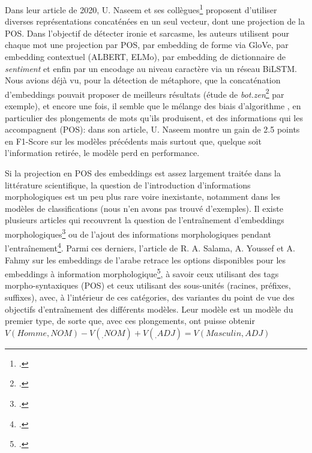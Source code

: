 Dans leur article de 2020, U. Naseem et ses collègues\footcite{naseem_towards_2020} proposent d'utiliser diverses représentations concaténées en un seul vecteur, dont une projection de la POS. Dans l'objectif de détecter ironie et sarcasme, les auteurs utilisent pour chaque mot une projection par POS, par embedding de forme via GloVe, par embedding contextuel (ALBERT, ELMo), par embedding de dictionnaire de \textit{sentiment} et enfin par un encodage au niveau caractère via un réseau BiLSTM. Nous avions déjà vu, pour la détection de métaphore, que la concaténation d'embeddings pouvait proposer de meilleurs résultats (étude de \textit{bot.zen}\footcite{stemle_using_2018} par exemple), et encore une fois, il semble que le mélange des biais d'algorithme  , en particulier des plongements de mots qu'ils produisent, et des informations qui les accompagnent (POS): dans son article, U. Naseem montre un gain de 2.5 points en F1-Score sur les modèles précédents mais surtout que, quelque soit l'information retirée, le modèle perd en performance.

Si la projection en POS des embeddings est assez largement traitée dans la littérature scientifique, la question de l'introduction d'informations morphologiques est un peu plus rare voire inexistante, notamment dans les modèles de classifications (nous n'en avons pas trouvé d'exemples). Il existe plusieurs articles qui recouvrent la question de l'entraînement d'embeddings morphologiques\footcite{cotterell_morphological_2015} ou de l'ajout des informations morphologiques pendant l'entraînement\footcite{cui_knet_2015}. Parmi ces derniers, l'article de R. A. Salama, A. Youssef et A. Fahmy sur les embeddings de l'arabe retrace les options disponibles pour les embeddings à information morphologique\footcite{salama_morphological_2018}, à savoir ceux utilisant des tags morpho-syntaxiques (POS) et ceux utilisant des sous-unités (racines, préfixes, suffixes), avec, à l'intérieur de ces catégories, des variantes du point de vue des objectifs d'entraînement des différents modèles. Leur modèle est un modèle du premier type, de sorte que, avec ces plongements, ont puisse obtenir $V(Homme,NOM) - V(_,NOM) + V(_,ADJ) = V(Masculin,ADJ)$

